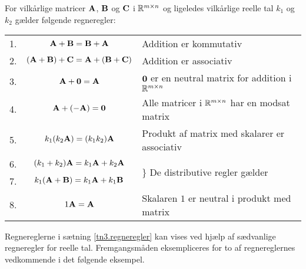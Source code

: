 \begin{theorem} \label{tn3.regneregler}
For vilkårlige matricer $ \mathbf{A} $, $ \mathbf{B} $ og $ \mathbf{C} $ i $ \mathbb{R}^{m \times n} $ og ligeledes vilkårlige reelle tal $ k_1 $ og $ k_2 $ gælder følgende regneregler: \smallskip \\
\begin{tabular}{lcl}
1. & $ \mathbf{A} + \mathbf{B} = \mathbf{B} + \mathbf{A} $ & Addition er kommutativ \smallskip \\
2. & $ (\mathbf{A} + \mathbf{B}) + \mathbf{C} = \mathbf{A} + (\mathbf{B} + \mathbf{C}) $ & Addition er associativ \smallskip \\
3. & $ \mathbf{A} + \bm{0} = \mathbf{A} $ & $ \bm{0} $ er en neutral matrix for addition i $ \mathbb{R}^{m \times n} $ \smallskip  \\
4. & $ \mathbf{A} + (-\mathbf{A}) = \bm{0} $ & Alle matricer i $ \mathbb{R}^{m \times n} $ har en modsat matrix \smallskip \\
5. & $ k_1(k_2\mathbf{A}) = (k_1k_2)\mathbf{A} $ & Produkt af matrix med skalarer er associativ \smallskip \\
6. & $ (k_1 + k_2)\mathbf{A} = k_1\mathbf{A} + k_2\mathbf{A} $ & \multirow{2}{10cm}{$\biggr\rbrace$ De distributive regler gælder} \smallskip \\
7. & $ k_1(\mathbf{A}+\mathbf{B}) = k_1\mathbf{A} + k_1\mathbf{B} $ &  \smallskip  \\
8. & $ 1\mathbf{A} = \mathbf{A} $ & Skalaren $ 1 $ er neutral i produkt med matrix \\
\end{tabular}
\end{theorem}

Regnereglerne i sætning \ref{tn3.regneregler} kan vises ved hjælp af sædvanlige regneregler for reelle tal. Fremgangsmåden eksempliceres for to af regnereglernes vedkommende i det følgende eksempel.

